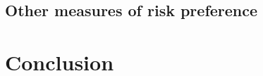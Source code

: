 \documentclass[]{article}
\begin{document}
\subsection{Other measures of risk preference}






\section{Conclusion}

\pagebreak



\end{document}

